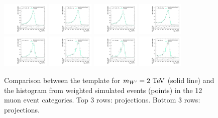 \begin{figure}[htpb]
  \includegraphics[width=0.2\textwidth]{fig/2Dfit/templateVsReco_WprToWH2000_r0_MJ_mu_HP_nobb_LDy.pdf}
  \includegraphics[width=0.2\textwidth]{fig/2Dfit/templateVsReco_WprToWH2000_r0_MJ_mu_LP_nobb_LDy.pdf}
  \includegraphics[width=0.2\textwidth]{fig/2Dfit/templateVsReco_WprToWH2000_r0_MJ_mu_HP_nobb_HDy.pdf}
  \includegraphics[width=0.2\textwidth]{fig/2Dfit/templateVsReco_WprToWH2000_r0_MJ_mu_LP_nobb_HDy.pdf}\\
  \includegraphics[width=0.2\textwidth]{fig/2Dfit/templateVsReco_WprToWH2000_r0_MJ_mu_HP_vbf_LDy.pdf}
  \includegraphics[width=0.2\textwidth]{fig/2Dfit/templateVsReco_WprToWH2000_r0_MJ_mu_LP_vbf_LDy.pdf}
  \includegraphics[width=0.2\textwidth]{fig/2Dfit/templateVsReco_WprToWH2000_r0_MJ_mu_HP_vbf_HDy.pdf}
  \includegraphics[width=0.2\textwidth]{fig/2Dfit/templateVsReco_WprToWH2000_r0_MJ_mu_LP_vbf_HDy.pdf}\\
  \caption{
    Comparison between the \Dy\WprtoWH template for $m_{\Wpr}=2\unit{TeV}$ (solid line) and the histogram from weighted simulated events (points) in the 12 muon event categories.
    Top 3 rows: \MVV projections.
    Bottom 3 rows: \MJ projections.
  }
  \label{fig:1dtemplateVsReco_WprToWH2000_Run2}
\end{figure}

